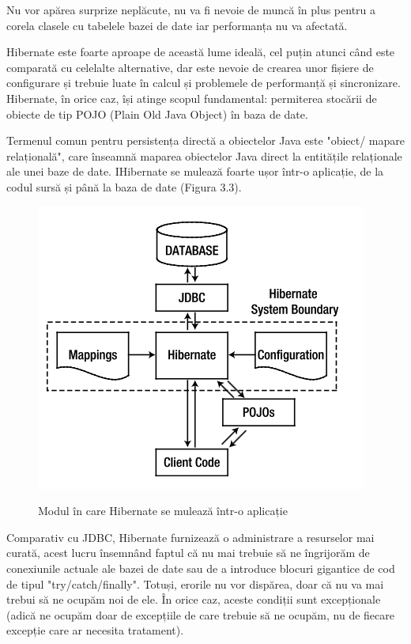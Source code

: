 \documentclass[12pt]{book}
\begin{document}
Nu vor apărea surprize neplăcute, nu va fi nevoie de muncă în plus pentru a corela clasele cu tabelele bazei de date iar performanța nu va afectată.\cite{BeginningHibernate}

Hibernate este foarte aproape de această lume ideală, cel puțin atunci când este comparată cu celelalte alternative, dar este nevoie de crearea unor fișiere de configurare și trebuie luate în calcul și problemele de performanță și sincronizare. Hibernate, în orice caz, își atinge scopul fundamental: permiterea stocării de obiecte de tip POJO (Plain Old Java Object) în baza de date. 

Termenul comun pentru persistența directă a obiectelor Java este "obiect/ mapare relațională", care înseamnă maparea obiectelor Java direct la entitățile relaționale ale unei baze de date. IHibernate se mulează foarte ușor într-o aplicație, de la codul sursă și până la baza de date (Figura 3.3).

\begin{figure}[!ht]
	\centering
	\includegraphics{Hibernate}
	\caption{Modul în care Hibernate se mulează într-o aplicație}
	\cite{BeginningHibernate}
\end{figure}

Comparativ cu JDBC, Hibernate furnizează o administrare a resurselor mai curată, acest lucru însemnând faptul că nu mai trebuie să ne îngrijorăm de conexiunile actuale ale bazei de date sau de a introduce blocuri gigantice de cod de tipul "try/catch/finally".
Totuși, erorile nu vor dispărea, doar că nu va mai trebui să ne ocupăm noi de ele. În orice caz, aceste condiții sunt excepționale (adică ne ocupăm doar de excepțiile de care trebuie să ne ocupăm, nu de fiecare excepție care ar necesita tratament).
\end{document}
